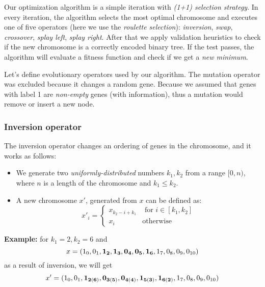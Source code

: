 \documentclass[12pt]{article}
\begin{document}
Our optimization algorithm is a simple iteration with \textit{(1+1) selection strategy}. In every iteration, the algorithm selects the most optimal chromosome and executes one of five operators (here we use the \textit{roulette selection}): \textit{inversion}, \textit{swap}, \textit{crossover}, \textit{splay left}, \textit{splay right}. After that we apply validation heuristics to check if the new chromosome is a correctly encoded binary tree. If the test passes, the algorithm will evaluate a fitness function and check if we get a \textit{new minimum}.

Let's define evolutionary operators used by our algorithm. The mutation operator was excluded because it changes a random gene. Because we assumed that genes with label 1 are \textit{non-empty} genes (with information), thus a mutation would remove or insert a new node.

\clearpage



\subsubsection{Inversion operator}

The inversion operator changes an ordering of genes in the chromosome, and it works as follows:
\begin{itemize}
\item We generate two \textit{uniformly-distributed} numbers $k_1, k_2$ from a range $[0, n)$, where $n$ is a length of the chromosome and $k_1 \leq k_2$.
\item A new chromosome $x'$, generated from $x$ can be defined as:
\[
    x'_i = \left\{
   \begin{array}{lr}
      x_{k_2 - i + k_1} & \textrm{ for } i\in\left[k_1, k_2\right]\\
      x_i &\textrm{otherwise}
   \end{array}
   \right.
\]
\end{itemize}

{\bf Example:} for $k_1 = 2, k_2 = 6$ and
\[
x = (1_0, 0_1, {\bf 1_2, 1_3, 0_4, 0_5, 1_6}, 1_7, 0_8, 0_9, 0_{10})
\]
as a result of inversion, we will get
\[
x' = (1_0, 0_1, {\bf 1_{2(6)}, 0_{3(5)}, 0_{4(4)}, 1_{5(3)}, 1_{6(2)}}, 1_7, 0_8, 0_9, 0_{10})
\]


\end{document}

